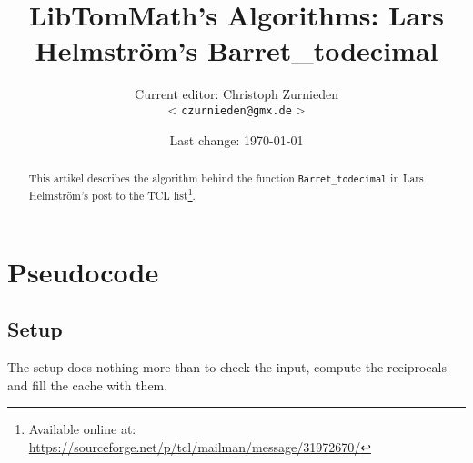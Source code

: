 \documentclass[a4paper,10pt]{article}
\theoremstyle{plain} %
\theoremstyle{definition}
\theoremstyle{remark}
\newcommand*{\smalltt}[1]{{\small\texttt{#1}}}
\begin{document}
\title{LibTomMath's Algorithms: Lars Helmstr\"om's Barret\_todecimal}
\author{Current editor: Christoph Zurnieden\\
        \small{\texttt{$<$czurnieden@gmx.de$>$}}}
\date{Last change: \today}
\maketitle

\renewcommand{\ttdefault}{pcr}

\begin{abstract}
This artikel describes the algorithm behind the function \smalltt{Barret\_todecimal} in Lars Helmstr\"om's post to the TCL list\footnote{Available online at: \url{https://sourceforge.net/p/tcl/mailman/message/31972670/}}.
\end{abstract}

\section{Pseudocode}
\subsection{Setup}

The setup does nothing more than to check the input, compute the reciprocals and fill the cache with them.
\end{document}
